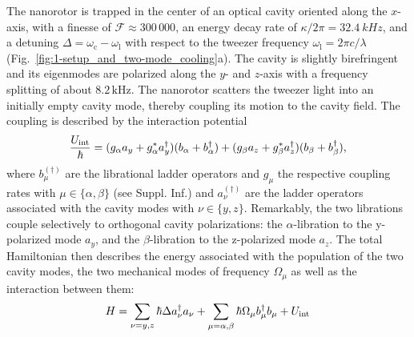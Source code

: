 \documentclass[reprint, amsmath, amssymb, superscriptaddress,showkeys,aps,pra]{revtex4-2}
\begin{document}
The nanorotor is trapped in the center of an optical cavity oriented along the $x$-axis, with a finesse of $\mathcal{F}\approx300\,000$, an energy decay rate of $\kappa/2\pi=\qty{32.4}{kHz}$, and a detuning $\Delta =\omega_\mathrm{c}-\omega_\mathrm{l}$ with respect to the tweezer frequency $\omega_\mathrm{l}=2\pi c/\lambda$ (Fig.~\ref{fig:1-setup_and_two-mode_cooling}a). The cavity is slightly birefringent and its eigenmodes are polarized along the $y$- and $z$-axis with a frequency splitting of about $8.2\,\text{kHz}$. The nanorotor scatters the tweezer light into an initially empty cavity mode, thereby coupling its motion to the cavity field. 
The coupling is described by the interaction potential
\begin{equation}\label{eq:quantinteraction_hamiltonian}
    \frac{U_{\rm int}}{\hbar} =  (g_\alpha a_y + g_\alpha^* a_y^\dagger) (b_\alpha +b_\alpha^\dagger) + (g_\beta a_z + g_\beta^* a_z^\dagger) (b_\beta + b_\beta^\dagger),
\end{equation}
where $b^{(\dagger)}_{\mu}$ are the librational ladder operators and $g_{\mu}$ the respective coupling rates with $\mu\in\{\alpha,\beta\}$ (see Suppl. Inf.) and $a^{(\dagger)}_{\nu}$ are the ladder operators associated with the cavity modes with $\nu\in\{y,z\}$.
Remarkably, the two librations couple selectively to orthogonal cavity polarizations: the $\alpha$-libration to the y-polarized mode $a_y$, and the $\beta$-libration to the z-polarized mode $a_z$.
The total Hamiltonian then describes the energy associated with the population of the two cavity modes, the two mechanical modes of frequency $\Omega_\mu$ as well as the interaction between them:
\begin{align}\label{eq:hamiltonian}
    H  = \sum_{\nu =y,z}\hbar\Delta a_\nu^\dagger a_\nu + \sum_{\mu = \alpha,\beta}\hbar\Omega_\mu b_\mu^\dagger b_\mu + U_{\rm int}
\end{align}
\end{document}
